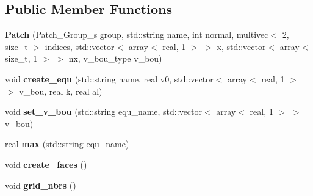 \subsection*{Public Member Functions}
\begin{DoxyCompactItemize}
\item 
\hypertarget{classPatch_ae700af2d8c407e31f4ccd3e023f4f50a}{
{\bfseries Patch} (Patch\_\-Group\_\-s group, std::string name, int normal, multivec$<$ 2, size\_\-t $>$ indices, std::vector$<$ array$<$ real, 1 $>$ $>$ x, std::vector$<$ array$<$ size\_\-t, 1 $>$ $>$ nx, v\_\-bou\_\-type v\_\-bou)}
\label{classPatch_ae700af2d8c407e31f4ccd3e023f4f50a}

\item 
\hypertarget{classPatch_ac8352cc930b37975da9627262540cebd}{
void {\bfseries create\_\-equ} (std::string name, real v0, std::vector$<$ array$<$ real, 1 $>$ $>$ v\_\-bou, real k, real al)}
\label{classPatch_ac8352cc930b37975da9627262540cebd}

\item 
\hypertarget{classPatch_af0311eccfd4f4fd356785f7b23dc8fa2}{
void {\bfseries set\_\-v\_\-bou} (std::string equ\_\-name, std::vector$<$ array$<$ real, 1 $>$ $>$ v\_\-bou)}
\label{classPatch_af0311eccfd4f4fd356785f7b23dc8fa2}

\item 
\hypertarget{classPatch_aa0a6036ed90bf4a98cc498f925fb530d}{
real {\bfseries max} (std::string equ\_\-name)}
\label{classPatch_aa0a6036ed90bf4a98cc498f925fb530d}

\item 
\hypertarget{classPatch_a2af23d9c0ebbb60d35c24bb3fb582b64}{
void {\bfseries create\_\-faces} ()}
\label{classPatch_a2af23d9c0ebbb60d35c24bb3fb582b64}

\item 
\hypertarget{classPatch_ae57b4223cce6c1ed9dbaaa5080a2501a}{
void {\bfseries grid\_\-nbrs} ()}
\label{classPatch_ae57b4223cce6c1ed9dbaaa5080a2501a}

\end{DoxyCompactItemize}
